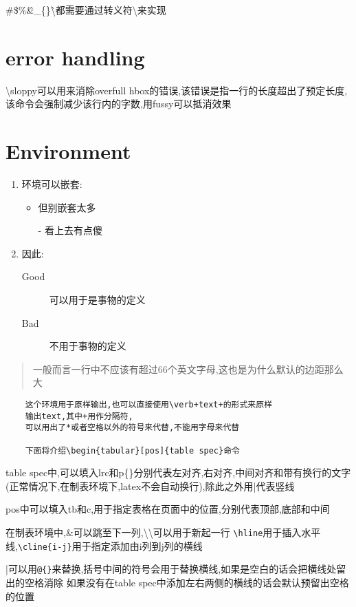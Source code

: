 \documentclass[a4paper,11pt]{article}%
\begin{document}
\#\$\%\^\&\_\{\}\`\textbackslash 都需要通过转义符\textbackslash 来实现

\section{error handling}
\textbackslash sloppy可以用来消除overfull hbox的错误,该错误是指一行的长度超出了预定长度,该命令会强制减少该行内的字数,用fussy可以抵消效果

\section{Environment}
\begin{enumerate}
    \item 环境可以嵌套:
    \begin{itemize}
        \item 但别嵌套太多
        \item [-] 看上去有点傻
    \end{itemize}
    \item 因此:
    \begin{description}
        \item[Good] 可以用于是事物的定义
        \item[Bad] 不用于事物的定义
    \end{description}
\end{enumerate}
\begin{quote}
    一般而言一行中不应该有超过66个英文字母,这也是为什么默认的边距那么大
\end{quote}
\begin{verbatim}
    这个环境用于原样输出,也可以直接使用\verb+text+的形式来原样
    输出text,其中+用作分隔符,
    可以用出了*或者空格以外的符号来代替,不能用字母来代替
    
    下面将介绍\begin{tabular}[pos]{table spec}命令
\end{verbatim}
table spec中,可以填入lrc和p\{\}分别代表左对齐,右对齐,中间对齐和带有换行的文字
(正常情况下,在制表环境下,latex不会自动换行),除此之外用|代表竖线

pos中可以填入tb和c,用于指定表格在页面中的位置,分别代表顶部,底部和中间

在制表环境中,\&可以跳至下一列,\textbackslash\textbackslash 可以用于新起一行
\verb+\hline+用于插入水平线,\verb+\cline{i-j}+用于指定添加由i列到j列的横线

|可以用\verb+@{}+来替换,括号中间的符号会用于替换横线,如果是空白的话会把横线处留出的空格消除
如果没有在table spec中添加左右两侧的横线的话会默认预留出空格的位置
\end{document}
